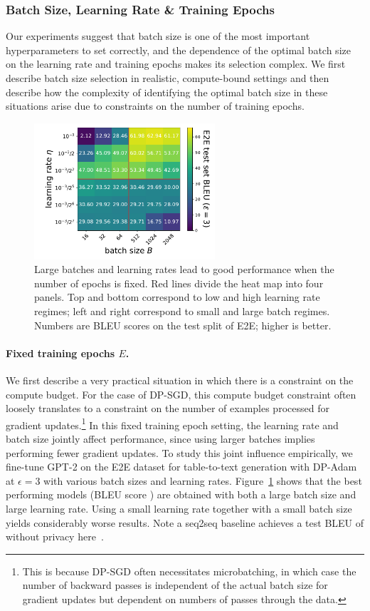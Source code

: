 \subsubsection{Batch Size, Learning Rate \& Training Epochs}
Our experiments suggest that batch size is one of the most important hyperparameters to set correctly, and the dependence of the optimal batch size on the learning rate and training epochs makes its selection complex.
We first describe batch size selection in realistic, compute-bound settings and then describe how the complexity of identifying the optimal batch size in these situations arise due to constraints on the number of training epochs.

\begin{figure}[htbp]
\centering
\includegraphics[width=0.6\textwidth]{figs/bs_vs_lr_BLEU.pdf}
\caption{
Large batches and learning rates lead to good performance when the number of epochs is fixed.
Red lines divide the heat map into four panels. Top and bottom correspond to low and high learning rate regimes; left and right correspond to small and large batch regimes.
Numbers are BLEU scores on the test split of E2E; higher is better.
}
\label{fig:bs_vs_lr}
\end{figure}

\paragraph{Fixed training epochs $E$.}
We first describe a very practical situation in which there is a constraint on the compute budget.
For the case of DP-SGD, this compute budget constraint often loosely translates to a constraint on the number of examples processed for gradient updates.\footnote{This is because DP-SGD often necessitates microbatching, in which case the number of backward passes is independent of the actual batch size for gradient updates but dependent on numbers of passes through the data.} 
In this fixed training epoch setting, the learning rate and batch size jointly affect performance, since using larger batches implies performing fewer gradient updates. 
To study this joint influence empirically, we fine-tune GPT-2 on the E2E dataset for table-to-text generation with DP-Adam at $\epsilon=3$ with various batch sizes and learning rates. 
Figure~\ref{fig:bs_vs_lr} shows that the best performing models (BLEU score )
are obtained with both a large batch size and large learning rate. 
Using a small learning rate together with a small batch size yields considerably worse results. 
Note a seq2seq baseline achieves a test 
BLEU of  without privacy here~\citep{wiseman2018learning}. 

